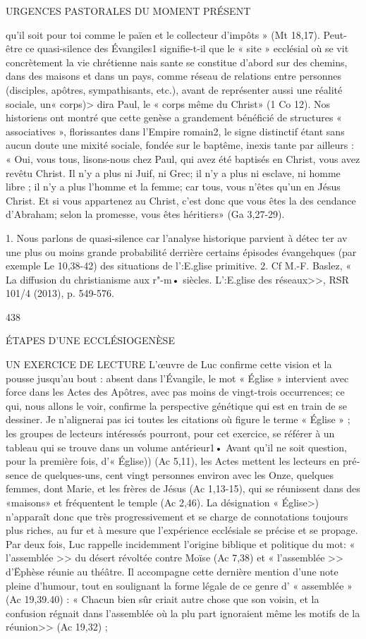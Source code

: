 URGENCES PASTORALES DU MOMENT PRÉSENT

qu'il soit pour toi comme le païen et le collecteur d'impôts »
(Mt 18,17).
Peut-être ce quasi-silence des Évangiles1 signifie-t-il que le
« site » ecclésial où se vit concrètement la vie chrétienne nais­ sante se constitue d'abord sur des chemins, dans des maisons et dans un pays, comme réseau de relations entre personnes (disciples, apôtres, sympathisants, etc.), avant de représenter aussi une réalité sociale, un« corps)> dira Paul, le « corps même du Christ» (1 Co 12). Nos historiens ont montré que cette genèse a grandement bénéficié de structures « associatives », florissantes dans l'Empire romain2, le signe distinctif étant sans aucun doute une mixité sociale, fondée sur le baptême, inexis­ tante par ailleurs :
« Oui, vous tous, lisons-nous chez Paul, qui avez été baptisés en Christ, vous avez revêtu Christ. Il n'y a plus ni Juif, ni Grec; il n'y a plus ni esclave, ni homme libre ; il n'y a plus l'homme et la femme; car tous, vous n'êtes qu'un en Jésus Christ. Et si vous appartenez au Christ, c'est donc que vous êtes la des­ cendance d'Abraham; selon la promesse, vous êtes héritiers» (Ga 3,27-29).




1.	Nous parlons de quasi-silence car l'analyse historique parvient à détec­ ter av une plus ou moins grande probabilité derrière certains épisodes évangehques (par exemple Le 10,38-42) des situations de l':E.glise primitive.
2.	Cf M.-F. Baslez, « La diffusion du christianisme aux r"-m• siècles.
L':E.glise des réseaux>>, RSR 101/4 (2013), p. 549-576.

438
 
ÉTAPES D'UNE ECCLÉSIOGENÈSE


UN EXERCICE DE LECTURE
L'œuvre de Luc confirme cette vision et la pousse jusqu'au bout : absent dans l'Évangile, le mot « Église » intervient avec force dans les Actes des Apôtres, avec pas moins de vingt-trois occurrences; ce qui, nous allons le voir, confirme la perspective génétique qui est en train de se dessiner. Je n'alignerai pas ici toutes les citations où figure le terme « Église » ; les groupes de lecteurs intéressés pourront, pour cet exercice, se référer à un tableau qui se trouve dans un volume antérieur1•
Avant qu'il ne soit question, pour la première fois,
d'« Église)) (Ac 5,11), les Actes mettent les lecteurs en pré­ sence de quelques-uns, cent vingt personnes environ avec les Onze, quelques femmes, dont Marie, et les frères de Jésus (Ac 1,13-15), qui se réunissent dans des «maisons» et fréquentent le temple (Ac 2,46). La désignation « Église>) n'apparaît donc que très progressivement et se charge de connotations toujours plus riches, au fur et à mesure que l'expérience ecclésiale se précise et se propage. Par deux fois, Luc rappelle incidemment l'origine biblique et politique du mot: « l'assemblée >> du désert révoltée contre Moïse (Ac 7,38) et « l'assemblée >> d'Ëphèse réunie au théâtre. Il accompagne cette dernière mention d'une note pleine d'humour, tout en soulignant la forme légale de ce genre d' « assemblée » (Ac 19,39.40) : « Chacun bien sûr criait autre chose que son voisin, et la confusion régnait dans l'assemblée où la plu­ part ignoraient même les motifs de la réunion>> (Ac 19,32) ;

